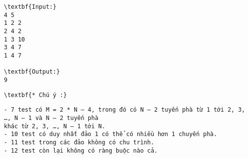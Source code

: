 \begin{verbatim}
\textbf{Input:}
4 5
1 2 2
2 4 2
1 3 10
3 4 7
1 4 7

\textbf{Output:}
9
\end{verbatim}
\begin{verbatim}
\textbf{* Chú ý :}\end{verbatim}
\begin{verbatim}
- 7 test có M = 2 * N – 4, trong đó có N – 2 tuyến phà từ 1 tới 2, 3, …, N – 1 và N – 2 tuyến phà
khác từ 2, 3, …, N – 1 tới N.
- 10 test có duy nhất đảo 1 có thể có nhiều hơn 1 chuyến phà.
- 11 test trong các đảo không có chu trình.
- 12 test còn lại không có ràng buộc nào cả. \end{verbatim}